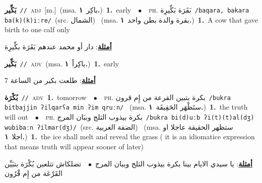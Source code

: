 \documentclass[10pt,a4paper,twoside]{article} %
\begin{document}
\begin{multicols}{2}
{\setlength\topsep{0pt}\textbf{\foreignlanguage{arabic}{بَكِّير}}\ {\color{gray}\texttt{//}\color{black}}\ \textsc{adj}\ [m.]\ \color{gray}(msa. \foreignlanguage{arabic}{باكِر}~\foreignlanguage{arabic}{\textbf{١.}})\color{black}\ \textbf{1.}~early\ \ $\bullet$\ \ \textsc{ph.} \color{gray} \foreignlanguage{arabic}{بَقَرَة بَكِّيرِة}\color{black}\ {\color{gray}\texttt{/{\sffamily baqara, bakara ba(k)(k)iːre}/}\color{black}}\ \color{gray}(src. \foreignlanguage{arabic}{الشمال})\color{black}\ \color{gray} (msa. \foreignlanguage{arabic}{بقرة والدة بطن واحد}~\foreignlanguage{arabic}{\textbf{١.}})\color{black}\ \textbf{1.}~A cow that gave birth to one calf only\  \begin{flushright}\color{gray}\foreignlanguage{arabic}{\textbf{\underline{\foreignlanguage{arabic}{أمثلة}}}: دار أو محمد عندهم بَقَرَة بكِّيرِة}\end{flushright}\color{black}} \vspace{2mm}

{\setlength\topsep{0pt}\textbf{\foreignlanguage{arabic}{بَكِّير}}\ {\color{gray}\texttt{//}\color{black}}\ \textsc{adv}\ \color{gray}(msa. \foreignlanguage{arabic}{باكِراً}~\foreignlanguage{arabic}{\textbf{١.}})\color{black}\ \textbf{1.}~early\  \begin{flushright}\color{gray}\foreignlanguage{arabic}{\textbf{\underline{\foreignlanguage{arabic}{أمثلة}}}: طلعت بكير من الساعة 7}\end{flushright}\color{black}} \vspace{2mm}

{\setlength\topsep{0pt}\textbf{\foreignlanguage{arabic}{بُكْرَة}}\ {\color{gray}\texttt{//}\color{black}}\ \textsc{adv}\ \textbf{1.}~tomorrow\ \ $\bullet$\ \ \textsc{ph.} \color{gray} \foreignlanguage{arabic}{بكرة بتبين القرعة من إِم قرون}\color{black}\ {\color{gray}\texttt{/{\sffamily bukra bitbajjin ʔilqarʕa min ʔim qruːn}/}\color{black}}\ \color{gray} (msa. \foreignlanguage{arabic}{ستَظْهَر الحَقِيقَة}~\foreignlanguage{arabic}{\textbf{١.}})\color{black}\ \textbf{1.}~the truth will out\ \ $\bullet$\ \ \textsc{ph.} \color{gray} \foreignlanguage{arabic}{بكرة بيذوب الثلج وببَان المرج}\color{black}\ {\color{gray}\texttt{/{\sffamily bukra bi(d)uːb ʔi(t)(t)al(dʒ) wubibaːn ʔilmar(dʒ)}/}\color{black}}\ \color{gray}(src. \foreignlanguage{arabic}{الضفة الغربية})\color{black}\ \color{gray} (msa. \foreignlanguage{arabic}{ستظهر الحقيقة عاجلا او اجلا}~\foreignlanguage{arabic}{\textbf{١.}})\color{black}\ \textbf{1.}~the ice shall melt and reveal the grass ( it is an idiomatice expression that means truth will appear sooner of later)\  \begin{flushright}\color{gray}\foreignlanguage{arabic}{\textbf{\underline{\foreignlanguage{arabic}{أمثلة}}}: يا سيدي الايام بينا بكرة بيذوب الثلج وببان المرج\ $\bullet$\ \  تضلكاش تتلعبن بُكْرَة بتبَيِّن القَرْعَة من إِم قْرُون}\end{flushright}\color{black}} \vspace{2mm}


\end{multicols}
\end{document}
